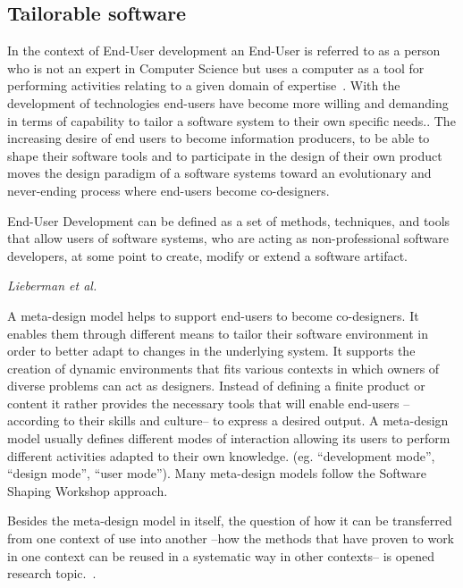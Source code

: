 \subsection{Tailorable software}

In the context of End-User development an End-User is referred to as a person who is not an expert in Computer Science but uses a computer as a tool for performing activities relating to a given domain of expertise~\cite{lieberman2006}. With the development of technologies end-users have become more willing and demanding in terms of capability to tailor a software system to their own specific needs.\cite{Nardi1993}. The increasing desire of end users to become information producers, to be able to shape their software tools and to participate in the design of their own product moves the design paradigm of a software systems toward an evolutionary and never-ending process where end-users become co-designers.\cite{Carmelo2011}

\epigraph{End-User Development can be defined as a set of methods, techniques, and tools that allow users of software systems, who are acting as non-professional software developers, at some point to create, modify or extend a software artifact.
}{\textit{Lieberman et al.\cite{lieberman2006}}}

A meta-design model helps to support end-users to become co-designers. It enables them through different means to tailor their software environment in order to better adapt to changes in the underlying system. It supports the creation of dynamic environments that fits various contexts in which owners of diverse problems can act as designers. Instead of defining a finite product or content it rather provides the necessary tools that will enable end-users --according to their skills and culture-- to express a desired output. A meta-design model usually defines different modes of interaction allowing its users to perform different activities adapted to their own knowledge. (eg.  ``development mode'', ``design mode'', ``user mode''). Many meta-design models follow the Software Shaping Workshop approach.

Besides the meta-design model in itself, the question of how it can be transferred from one context of use into another --how the methods that have proven to work in one context can be reused in a systematic way in other contexts-- is opened research topic.~\cite{Carmelo2014}.